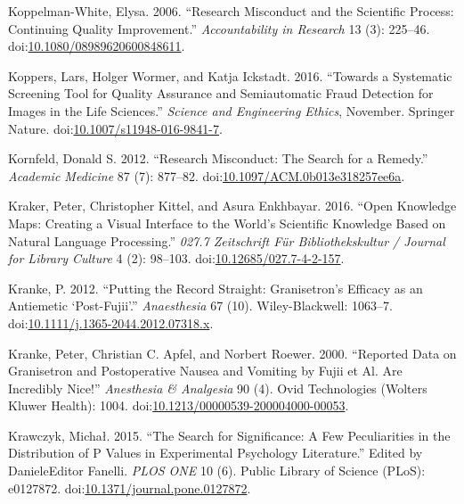 \documentclass[a5paper]{book}
\begin{document}
\hypertarget{ref-doi:10.1080ux2f08989620600848611}{}
Koppelman-White, Elysa. 2006. ``Research Misconduct and the Scientific
Process: Continuing Quality Improvement.'' \emph{Accountability in
Research} 13 (3): 225--46.
doi:\href{https://doi.org/10.1080/08989620600848611}{10.1080/08989620600848611}.

\hypertarget{ref-doi:10.1007ux2fs11948-016-9841-7}{}
Koppers, Lars, Holger Wormer, and Katja Ickstadt. 2016. ``Towards a
Systematic Screening Tool for Quality Assurance and Semiautomatic Fraud
Detection for Images in the Life Sciences.'' \emph{Science and
Engineering Ethics}, November. Springer Nature.
doi:\href{https://doi.org/10.1007/s11948-016-9841-7}{10.1007/s11948-016-9841-7}.

\hypertarget{ref-doi:10.1097ux2fACM.0b013e318257ee6a}{}
Kornfeld, Donald S. 2012. ``Research Misconduct: The Search for a
Remedy.'' \emph{Academic Medicine} 87 (7): 877--82.
doi:\href{https://doi.org/10.1097/ACM.0b013e318257ee6a}{10.1097/ACM.0b013e318257ee6a}.

\hypertarget{ref-doi:10.12685ux2f027.7-4-2-157}{}
Kraker, Peter, Christopher Kittel, and Asura Enkhbayar. 2016. ``Open
Knowledge Maps: Creating a Visual Interface to the World's Scientific
Knowledge Based on Natural Language Processing.'' \emph{027.7
Zeitschrift Für Bibliothekskultur / Journal for Library Culture} 4 (2):
98--103.
doi:\href{https://doi.org/10.12685/027.7-4-2-157}{10.12685/027.7-4-2-157}.

\hypertarget{ref-doi:10.1111ux2fj.1365-2044.2012.07318.x}{}
Kranke, P. 2012. ``Putting the Record Straight: Granisetron's Efficacy
as an Antiemetic `Post-Fujii'.'' \emph{Anaesthesia} 67 (10).
Wiley-Blackwell: 1063--7.
doi:\href{https://doi.org/10.1111/j.1365-2044.2012.07318.x}{10.1111/j.1365-2044.2012.07318.x}.

\hypertarget{ref-doi:10.1213ux2f00000539-200004000-00053}{}
Kranke, Peter, Christian C. Apfel, and Norbert Roewer. 2000. ``Reported
Data on Granisetron and Postoperative Nausea and Vomiting by Fujii et
Al. Are Incredibly Nice!'' \emph{Anesthesia \& Analgesia} 90 (4). Ovid
Technologies (Wolters Kluwer Health): 1004.
doi:\href{https://doi.org/10.1213/00000539-200004000-00053}{10.1213/00000539-200004000-00053}.

\hypertarget{ref-doi:10.1371ux2fjournal.pone.0127872}{}
Krawczyk, Michał. 2015. ``The Search for Significance: A Few
Peculiarities in the Distribution of P Values in Experimental Psychology
Literature.'' Edited by DanieleEditor Fanelli. \emph{PLOS ONE} 10 (6).
Public Library of Science (PLoS): e0127872.
doi:\href{https://doi.org/10.1371/journal.pone.0127872}{10.1371/journal.pone.0127872}.
\end{document}
